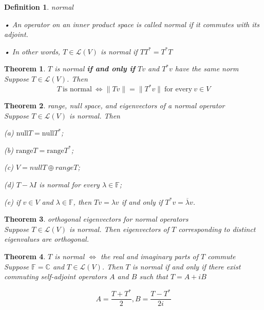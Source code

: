 \documentclass{article}
\newtheorem{theorem}{Theorem}[subsection]
\newtheorem{definition}{Definition}[subsection]
\newcommand{\CC}{\mathbb{C}}
\newcommand{\FF}{\mathbb{F}}
\newcommand{\range}{\text{range}}
\newcommand{\n}{\text{null}}
\begin{document}
\begin{CJK}{UTF8}{gkai}
\begin{definition}
    normal

    • An operator on an inner product space is called normal if it commutes with its adjoint.

    • In other words, $T \in \mathcal{L}(V)$ is normal if $TT^\ast = T^\ast T$
\end{definition}

\begin{theorem}
    $T$ is normal \textbf{if and only if} $Tv$ and $T^\ast v$ have the same norm\\

    Suppose $T \in \mathcal{L}(V)$. Then
    \[T ~\text{is normal}~ \Leftrightarrow \|Tv\| = \|T^\ast v\| ~\text{for every}~ v \in V\]
\end{theorem}

\begin{theorem}
    range, null space, and eigenvectors of a normal operator\\

    Suppose $T \in \mathcal{L}(V)$ is normal. Then

    (a) $\n T = \n T^\ast$;

    (b) $\range T = \range T^\ast$;

    (c) $V = nullT \oplus rangeT$;

    (d) $T - \lambda I$ is normal for every $\lambda \in \FF$;

    (e) if $v \in V$ and $\lambda \in \FF$, then $Tv = \lambda v$ if and only if $T^\ast v = \overline{\lambda }v$.
\end{theorem}

\begin{theorem}
    orthogonal eigenvectors for normal operators\\

    Suppose $T \in \mathcal{L}(V)$ is normal. Then eigenvectors of $T$ corresponding to distinct eigenvalues are orthogonal.
\end{theorem}

\begin{theorem}
    $T$ is normal $\Leftrightarrow$ the real and imaginary parts of $T$ commute\\

    Suppose $\FF = \CC$ and $T \in \mathcal{L}(V)$. Then $T$ is normal if and only if there exist commuting self-adjoint operators $A$ and $B$ such that $T =  A + iB$
\end{theorem}

\[A = \dfrac{T + T^\ast}{2}, B = \dfrac{T - T^\ast}{2i}\]


\end{CJK}
\end{document}
